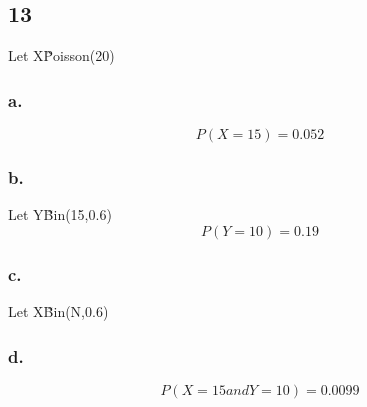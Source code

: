 \documentclass[11pt]{article}
\begin{document}
\subsection{13}
Let X\~Poisson(20)
\subsubsection{a.} 
\[ P(X=15) = 0.052 \]
\subsubsection{b.}
Let Y\~Bin(15,0.6)
\[ P(Y=10) = 0.19 \]

\subsubsection{c.}
Let X\~Bin(N,0.6)

\subsubsection{d.}
\[P(X=15 and Y=10) = 0.0099 \]
\end{document}
